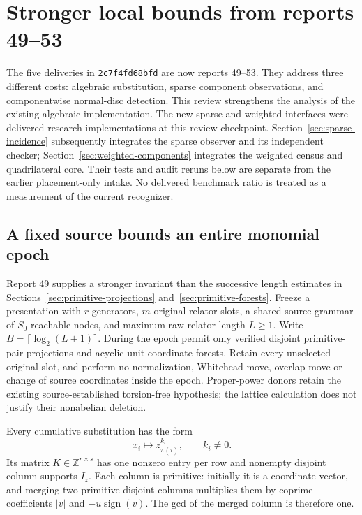 \section{Stronger local bounds from reports 49--53}
\label{sec:incoming-2c7f}

The five deliveries in \texttt{2c7f4fd68bfd} are now reports 49--53.
They address three different costs: algebraic substitution, sparse component
observations, and componentwise normal-disc detection. This review strengthens
the analysis of the existing algebraic implementation. The new sparse and
weighted interfaces were delivered research implementations at this review
checkpoint. Section~\ref{sec:sparse-incidence} subsequently integrates the
sparse observer and its independent checker; Section~\ref{sec:weighted-components}
integrates the weighted census and quadrilateral core. Their tests and audit
reruns below are separate from the earlier
placement-only intake. No delivered benchmark ratio is treated as a measurement
of the current recognizer.

\subsection{A fixed source bounds an entire monomial epoch}

Report 49 supplies a stronger invariant than the successive length estimates
in Sections~\ref{sec:primitive-projections} and~\ref{sec:primitive-forests}.
Freeze a presentation with $r$ generators, $m$ original relator slots, a shared
source grammar of $S_0$ reachable nodes, and maximum raw relator length
$L\ge1$. Write $B=\lceil\log_2(L+1)\rceil$. During the epoch permit only
verified disjoint primitive-pair projections and acyclic unit-coordinate
forests. Retain every unselected original slot, and perform no normalization,
Whitehead move, overlap move or change of source coordinates inside the epoch.
Proper-power donors retain the existing source-established torsion-free
hypothesis; the lattice calculation does not justify their nonabelian deletion.

Every cumulative substitution has the form
\[
 x_i\longmapsto z_{\pi(i)}^{k_i},\qquad k_i\ne0.
\]
Its matrix $K\in\mathbb Z^{r\times s}$ has one nonzero entry per row and
nonempty disjoint column supports $I_z$. Each column is primitive: initially
it is a coordinate vector, and merging two primitive disjoint columns
multiplies them by coprime coefficients $|v|$ and $-u\operatorname{sign}(v)$.
The gcd of the merged column is therefore one.

